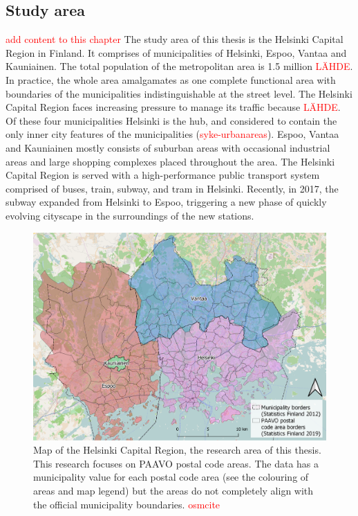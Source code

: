 \newpage
\subsection{Study area}
\justify

\textcolor{red}{add content to this chapter} The study area of this thesis is the Helsinki Capital Region in Finland. It comprises of municipalities of Helsinki, Espoo, Vantaa and Kauniainen. The total population of the metropolitan area is 1.5 million \textcolor{red}{LÄHDE}. In practice, the whole area amalgamates as one complete functional area with boundaries of the municipalities indistinguishable at the street level. The Helsinki Capital Region faces increasing pressure to manage its traffic because \textcolor{red}{LÄHDE}. Of these four municipalities Helsinki is the hub, and considered to contain the only inner city features of the municipalities (\textcolor{red}{syke-urbanareas}). Espoo, Vantaa and Kauniainen mostly consists of suburban areas with occasional industrial areas and large shopping complexes placed throughout the area. The Helsinki Capital Region is served with a high-performance public transport system comprised of buses, train, subway, and tram in Helsinki. Recently, in 2017, the subway expanded from Helsinki to Espoo, triggering a new phase of quickly evolving cityscape in the surroundings of the new stations.

\begin{figure}[H]%
    \includegraphics[width=\textwidth]{images/thesis_resarea.png}
    \caption[Research area map]{Map of the Helsinki Capital Region, the research area of this thesis. This research focuses on PAAVO postal code areas. The data has a municipality value for each postal code area (see the colouring of areas and map legend) but the areas do not completely align with the official municipality boundaries. \textcolor{red}{osmcite}}%
    \label{fig:thesis_resarea}%
\end{figure}

